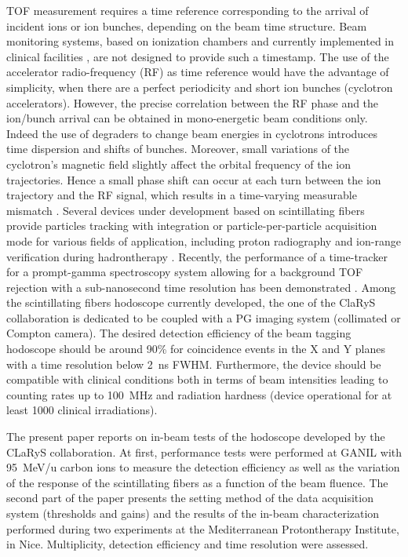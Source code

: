 \documentclass[a4paper,11pt]{article}
\begin{document}
TOF measurement requires a time reference corresponding to the arrival of incident ions or ion bunches, depending on the beam time structure. Beam monitoring systems, based on ionization chambers and currently implemented in clinical facilities \cite{Stelzer2002}, are not designed to provide such a timestamp. The use of the accelerator radio-frequency (RF) as time reference would have the advantage of simplicity, when there are a perfect periodicity and short ion bunches (cyclotron accelerators). However, the precise correlation between the RF phase and the ion/bunch arrival can be obtained in mono-energetic beam conditions only. 
Indeed the use of degraders to change beam energies in cyclotrons introduces time dispersion and shifts of bunches. Moreover, small variations of the cyclotron’s magnetic field slightly affect the orbital frequency of the ion trajectories. Hence a small phase shift can occur at each turn between the ion trajectory and the RF signal, which results in a time-varying measurable mismatch \cite{Werner2019}. 
Several devices under development based on scintillating fibers provide particles tracking with integration \cite{Leverington2018} or particle-per-particle \cite{Horikawa2004, Achenbach2008, Braccini2012} acquisition mode for various fields of application, including proton radiography \cite{Presti2016} and ion-range verification during hadrontherapy \cite{PAPA2016}. Recently, the performance of a time-tracker for a prompt-gamma spectroscopy system allowing for a background TOF rejection with a sub-nanosecond time resolution has been demonstrated \cite{Martins2020}. Among the scintillating fibers hodoscope currently developed, the one of the ClaRyS collaboration is dedicated to be coupled with a PG imaging system (collimated or Compton camera). The desired detection efficiency of the beam tagging hodoscope should be around 90\% for coincidence events in the X and Y planes with a time resolution below 2~ns FWHM. Furthermore, the device should be compatible with clinical conditions both in terms of beam intensities leading to counting rates up to 100~MHz and radiation hardness (device operational for at least 1000 clinical irradiations).

The present paper reports on in-beam tests of the hodoscope developed by the CLaRyS collaboration. At first, performance tests were performed at GANIL with 95~MeV/u carbon ions to measure the detection efficiency as well as the variation of the response of the scintillating fibers as a function of the beam fluence. The second part of the paper presents the setting method of the data acquisition system (thresholds and gains) and the results of the in-beam characterization performed during two experiments at the Mediterranean Protontherapy Institute, in Nice. Multiplicity, detection efficiency and time resolution were assessed. 
\end{document}

